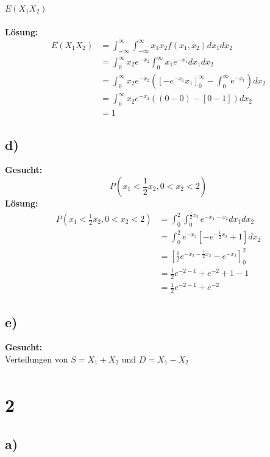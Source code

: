 \documentclass{article}
\begin{document}
$E(X_1X_2)$\\\\
\textbf{Lösung:}\\
\begin{align*}
    E(X_1X_2) &= \int_{-\infty}^{\infty}\int_{-\infty}^{\infty}x_1 x_2 f(x_1, x_2) dx_1 dx_2 \\
    &= \int_{0}^{\infty} x_2 e^{-x_2}\int_{0}^{\infty}x_1 e^{-x_1} dx_1 dx_2 \\
    &= \int_{0}^{\infty} x_2 e^{-x_2} (\left[-e^{-x_1}x_1\right]_0^{\infty} - \int_{0}^{\infty} e^{-x_1}) dx_2 \\
    &= \int_{0}^{\infty} x_2 e^{-x_2} \left((0 - 0 ) - \left[0-1\right]\right) dx_2\\
    &= 1
\end{align*}
\subsection*{d)}
\textbf{Gesucht:} \\
\[P(x_1< \frac{1}{2}x_2, 0 < x_2 <2)\]
\textbf{Lösung:} \\
\begin{align*}
    P(x_1< \frac{1}{2}x_2, 0 < x_2 <2) &=\int_{0}^{2} \int_{0}^{\frac{1}{2} x_2} e^{-x_1-x_2}dx_1 dx_2 \\
    &= \int_{0}^{2}e^{-x_2} \left[-e^{-\frac{1}{2}x_2} + 1\right] dx_2\\
    &= \left[\frac{1}{2}e^{-x_2-\frac{1}{2}x_2} -e^{-x_2}\right]_0^2 \\
    &= \frac{1}{2}e^{-2 - 1} + e^{-2}+ 1 - 1 \\
    &= \frac{1}{2}e^{-2 - 1} + e^{-2}
\end{align*}

\subsection*{e)}
\textbf{Gesucht:}\\

Verteilungen von $S = X_1 + X_2$ und $D= X_1 - X_2$
\begin{align*}
    \quad
\end{align*}

\section*{2}
\subsection*{a)}
\end{document}
